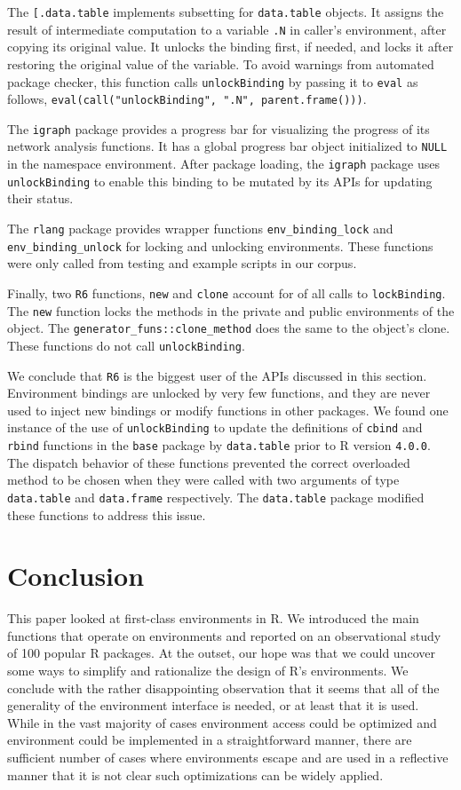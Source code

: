 \documentclass[10pt,review,sigplan,anonymous=true,authorversion=true,nonacm=true]{acmart}
\newcommand{\code}[1]{\lstinline |#1|\xspace}
\renewcommand{\c}[1]{\lstinline |#1|\xspace}
\begin{document}
The \c{[.data.table} implements subsetting for \c{data.table} objects. It
assigns the result of intermediate computation to a variable \c{.N} in caller's
environment, after copying its original value. It unlocks the binding first, if
needed, and locks it after restoring the original value of the variable. To
avoid warnings from automated package checker, this function calls
\c{unlockBinding} by passing it to \c{eval} as follows,
\c{eval(call("unlockBinding", ".N", parent.frame()))}.

The \c{igraph} package provides a progress bar for visualizing the progress of
its network analysis functions. It has a global progress bar object initialized
to \c{NULL} in the namespace environment. After package loading, the \c{igraph}
package uses \c{unlockBinding} to enable this binding to be mutated by its APIs
for updating their status.

The \c{rlang} package provides wrapper functions \c{env_binding_lock} and
\c{env_binding_unlock} for locking and unlocking environments. These functions
were only called from testing and example scripts in our corpus.

Finally, two \c{R6} functions, \c{new} and \c{clone} account for
\LockBindingRSixCallPerc of all calls to \c{lockBinding}. The \c{new} function
locks the methods in the private and public environments of the object. The
\c{generator_funs::clone_method} does the same to the object's clone. These
functions do not call \c{unlockBinding}.


We conclude that \c{R6} is the biggest user of the APIs discussed in this
section. Environment bindings are unlocked by very few functions, and they are
never used to inject new bindings or modify functions in other packages. We
found one instance of the use of \c{unlockBinding} to update the definitions of
\code{cbind} and \code{rbind} functions in the \code{base} package by
\code{data.table} prior to R version \texttt{4.0.0}. The dispatch behavior of
these functions prevented the correct overloaded method to be chosen when they
were called with two arguments of type \c{data.table} and \c{data.frame}
respectively. The \c{data.table} package modified these functions to address
this issue.

\section{Conclusion}

This paper looked at first-class environments in R. We introduced the main
functions that operate on environments and reported on an observational study of
100 popular R packages. At the outset, our hope was that we could uncover some
ways to simplify and rationalize the design of R's environments. We conclude
with the rather disappointing observation that it seems that all of the
generality of the environment interface is needed, or at least that it is used.
While in the vast majority of cases environment access could be optimized and
environment could be implemented in a straightforward manner, there are
sufficient number of cases where environments escape and are used in a
reflective manner that it is not clear such optimizations can be widely applied.
\end{document}
